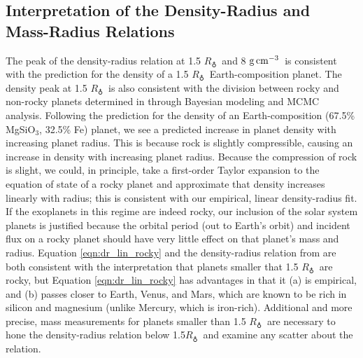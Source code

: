 \documentclass[iop]{emulateapj}
\newcommand{\gcmc}{\ensuremath{\rm g\,cm^{-3}}}
\newcommand{\gcc}{\gcmc}
\newcommand{\rearth}{\ensuremath{R_\earth}}
\begin{document}
\subsection{Interpretation of the Density-Radius and Mass-Radius Relations}
The peak of the density-radius relation at 1.5 \rearth\ and 8 \gcc\ is consistent with the \citet{Seager2007} prediction for the density of a 1.5 \rearth\ Earth-composition planet.  The density peak at 1.5 \rearth\ is also consistent with the division between rocky and non-rocky planets determined in \citet{Rogers2014} through Bayesian modeling and MCMC analysis.  Following the \citet{Seager2007} prediction for the density of an Earth-composition (67.5\% MgSiO$_3$, 32.5\% Fe) planet, we see a predicted increase in planet density with increasing planet radius.  This is because rock is slightly compressible, causing an increase in density with increasing planet radius.   Because the compression of rock is slight, we could, in principle, take a first-order Taylor expansion to the equation of state of a rocky planet and approximate that density increases linearly with radius; this is consistent with our empirical, linear density-radius fit.  If the exoplanets in this regime are indeed rocky, our inclusion of the solar system planets is justified because the orbital period (out to Earth's orbit) and incident flux on a rocky planet should have very little effect on that planet's mass and radius.  Equation \ref{eqn:dr_lin_rocky} and the density-radius relation from \citet{Seager2007} are both consistent with the interpretation that planets smaller that 1.5 \rearth\ are rocky, but Equation \ref{eqn:dr_lin_rocky} has advantages in that it (a) is empirical, and (b) passes closer to Earth, Venus, and Mars, which are known to be rich in silicon and magnesium (unlike Mercury, which is iron-rich).  Additional and more precise, mass measurements for planets smaller than 1.5 \rearth\ are necessary to hone the density-radius relation below 1.5\rearth\ and examine any scatter about the relation.
\end{document}
